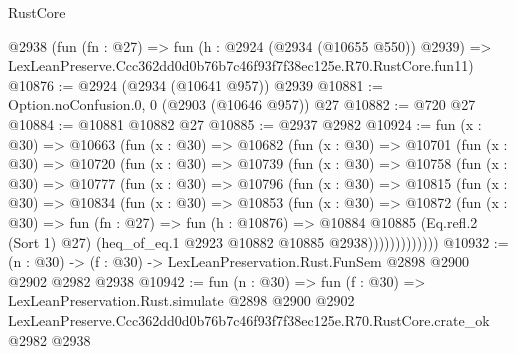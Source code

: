 \begin{lexlean}{RustCore}
\begin{coremodule}
    @2938
    (fun (fn : @27) =>
    fun (h : @2924 (@2934 (@10655 @550)) @2939) =>
    LexLeanPreserve.Ccc362dd0d0b76b7c46f93f7f38ec125e.R70.RustCore.fun11)
@10876 := @2924 (@2934 (@10641 @957)) @2939
@10881 := Option.noConfusion.{0, 0} (@2903 (@10646 @957)) @27
@10882 := @720 @27
@10884 := @10881 @10882 @27
@10885 := @2937 @2982
@10924 := fun (x : @30) =>
  @10663
    (fun (x : @30) =>
    @10682
      (fun (x : @30) =>
      @10701
        (fun (x : @30) =>
        @10720
          (fun (x : @30) =>
          @10739
            (fun (x : @30) =>
            @10758
              (fun (x : @30) =>
              @10777
                (fun (x : @30) =>
                @10796
                  (fun (x : @30) =>
                  @10815
                    (fun (x : @30) =>
                    @10834
                      (fun (x : @30) =>
                      @10853
                        (fun (x : @30) =>
                        @10872
                          (fun (x : @30) =>
                          fun (fn : @27) =>
                          fun (h : @10876) =>
                          @10884
                            @10885
                            (Eq.refl.{2} (Sort 1) @27)
                            (heq_of_eq.{1} @2923 @10882 @10885 @2938)))))))))))))
@10932 := (n : @30) -> (f : @30) -> LexLeanPreservation.Rust.FunSem @2898 @2900 @2902 @2982 @2938
@10942 := fun (n : @30) =>
  fun (f : @30) =>
  LexLeanPreservation.Rust.simulate
    @2898
    @2900
    @2902
    LexLeanPreserve.Ccc362dd0d0b76b7c46f93f7f38ec125e.R70.RustCore.crate_ok
    @2982
    @2938
\end{coremodule}
\end{lexlean}
